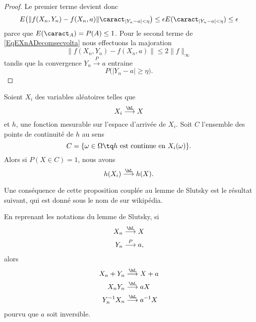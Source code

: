 \begin{proof}
	Le premier terme devient donc
	\begin{equation}
		E\big( \| f(X_n,Y_n)-f(X_n,a) \|\caract_{| Y_n-a |<\eta} \big)\leq \epsilon E(\caract_{| Y_n-a |<\eta})\leq \epsilon
	\end{equation}
	parce que \( E(\caract_A)=P(A)\leq 1\). Pour le second terme de \eqref{EqEXnADecomsecvolta} nous effectuons la majoration
	\begin{equation}
		\| f(X_n,Y_n)-f(X_n,a) \|\leq 2\| f \|_{\infty}
	\end{equation}
	tandis que la convergence \( Y_n\stackrel{P}{\longrightarrow} a\) entraine
	\begin{equation}
		P\big( | Y_n-a |\geq \eta \big).
	\end{equation}
\end{proof}

\begin{proposition}     \label{PropcvLsousfonc}
	Soient \( X_i\) des variables aléatoires telles que
	\begin{equation}
		X_i\stackrel{\hL}{\longrightarrow} X
	\end{equation}
	et \( h\), une fonction mesurable sur l'espace d'arrivée de \( X_i\). Soit \( C\) l'ensemble des points de continuité de \( h\) au sens
	\begin{equation}
		C=\{ \omega\in\Omega\tq  h\text{ est continue en } X_i(\omega) \}.
	\end{equation}
	Alors si \( P(X\in C)=1\), nous avons
	\begin{equation}
		h(X_i)\stackrel{\hL}{\longrightarrow}h(X).
	\end{equation}
\end{proposition}

Une conséquence de cette proposition couplée au lemme de Slutsky est le résultat suivant, qui est donné sous le nom de  sur wikipédia.
\begin{corollary}       \label{CorINgTPH}
	En reprenant les notations du lemme de Slutsky, si
	\begin{subequations}
		\begin{align}
			X_n & \stackrel{\hL}{\longrightarrow} X \\
			Y_n & \stackrel{P}{\longrightarrow} a,
		\end{align}
	\end{subequations}
	alors
	\begin{subequations}
		\begin{align}
			X_n+Y_n     & \stackrel{\hL}{\longrightarrow}X+a     \\
			X_nY_n      & \stackrel{\hL}{\longrightarrow}aX      \\
			Y_n^{-1}X_n & \stackrel{\hL}{\longrightarrow}a^{-1}X \\
		\end{align}
	\end{subequations}
	pourvu que \( a\) soit inversible.
\end{corollary}


